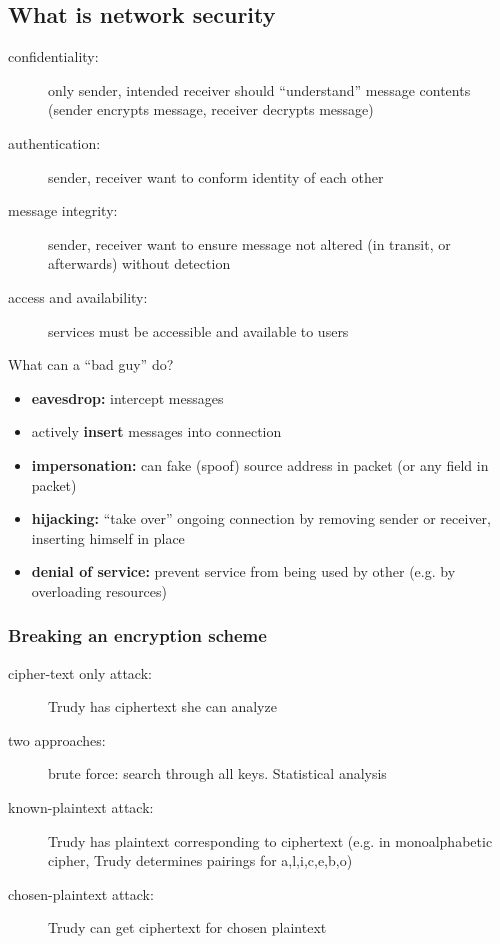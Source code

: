 \subsection{What is network security}
\begin{description}
	\item[confidentiality:] only sender, intended receiver should ``understand'' message contents (sender encrypts message, receiver decrypts message)
	\item[authentication:] sender, receiver want to conform identity of each other
	\item[message integrity:] sender, receiver want to ensure message not altered (in transit, or afterwards) without detection
	\item[access and availability:] services must be accessible and available to users
\end{description}
What can a ``bad guy'' do?
\begin{itemize}
	\item \textbf{eavesdrop:} intercept messages
	\item actively \textbf{insert} messages into connection
	\item \textbf{impersonation:} can fake (spoof) source address in packet (or any field in packet)
	\item \textbf{hijacking:} ``take over'' ongoing connection by removing sender or receiver, inserting himself in place
	\item \textbf{denial of service:} prevent service from being used by other (e.g. by overloading resources)
\end{itemize}
\subsubsection{Breaking an encryption scheme}
\begin{description}
	\item[cipher-text only attack:] Trudy has ciphertext she can analyze
	\item[two approaches:] brute force: search through all keys. Statistical analysis
	\item[known-plaintext attack:] Trudy has plaintext corresponding to ciphertext (e.g. in monoalphabetic cipher, Trudy determines pairings for a,l,i,c,e,b,o)
	\item[chosen-plaintext attack:] Trudy can get ciphertext for chosen plaintext
\end{description}

